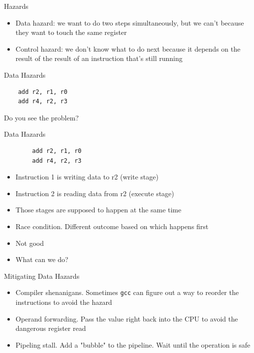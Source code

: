 \begin{frame}{Hazards}
	\begin{itemize}
		\item Data hazard: we want to do two steps simultaneously, but we can't because they want to touch the same register
		\item Control hazard: we don't know what to do next because it depends on the result of the result of an instruction that's still running
	\end{itemize}
\end{frame}


\begin{frame}[fragile]{Data Hazards}

	\begin{verbatim}
	add r2, r1, r0
	add r4, r2, r3
\end{verbatim}


	Do you see the problem?
\end{frame}


\begin{frame}[fragile]{Data Hazards}
	\begin{verbatim}
		add r2, r1, r0
		add r4, r2, r3
	\end{verbatim}
	\begin{itemize}
		\item Instruction 1 is writing data to r2 (write stage)
		\item Instruction 2 is reading data from r2 (execute stage)
		\item Those stages are supposed to happen at the same time
		\item Race condition. Different outcome based on which happens first
		\item Not good
		\item What can we do?
	\end{itemize}
\end{frame}


\begin{frame}{Mitigating Data Hazards}
	\begin{itemize}
		\item Compiler shenanigans. Sometimes \texttt{gcc} can figure out a way to reorder the instructions to avoid the hazard
		\item Operand forwarding. Pass the value right back into the CPU to avoid the dangerous register read
		\item Pipeling stall. Add a "bubble" to the pipeline. Wait until the operation is safe
	\end{itemize}
\end{frame}

